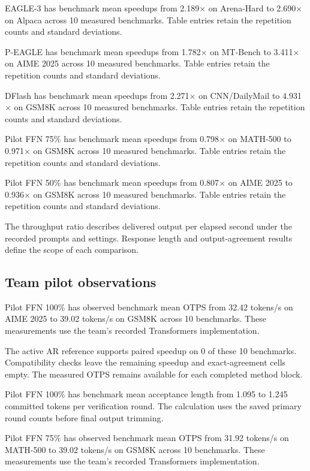 EAGLE-3 has benchmark mean speedups from 2.189\(\times\) on Arena-Hard to 2.690\(\times\) on Alpaca across 10 measured benchmarks. Table entries retain the repetition counts and standard deviations.

P-EAGLE has benchmark mean speedups from 1.782\(\times\) on MT-Bench to 3.411\(\times\) on AIME 2025 across 10 measured benchmarks. Table entries retain the repetition counts and standard deviations.

DFlash has benchmark mean speedups from 2.271\(\times\) on CNN/DailyMail to 4.931\(\times\) on GSM8K across 10 measured benchmarks. Table entries retain the repetition counts and standard deviations.

Pilot FFN 75\% has benchmark mean speedups from 0.798\(\times\) on MATH-500 to 0.971\(\times\) on GSM8K across 10 measured benchmarks. Table entries retain the repetition counts and standard deviations.

Pilot FFN 50\% has benchmark mean speedups from 0.807\(\times\) on AIME 2025 to 0.936\(\times\) on GSM8K across 10 measured benchmarks. Table entries retain the repetition counts and standard deviations.

The throughput ratio describes delivered output per elapsed second under the recorded prompts and settings. Response length and output-agreement results define the scope of each comparison.

\subsection{Team pilot observations}

Pilot FFN 100\% has observed benchmark mean OTPS from 32.42 tokens/s on AIME 2025 to 39.02 tokens/s on GSM8K across 10 benchmarks. These measurements use the team's recorded Transformers implementation.

The active AR reference supports paired speedup on 0 of these 10 benchmarks. Compatibility checks leave the remaining speedup and exact-agreement cells empty. The measured OTPS remains available for each completed method block.

Pilot FFN 100\% has benchmark mean acceptance length from 1.095 to 1.245 committed tokens per verification round. The calculation uses the saved primary round counts before final output trimming.

Pilot FFN 75\% has observed benchmark mean OTPS from 31.92 tokens/s on MATH-500 to 39.02 tokens/s on GSM8K across 10 benchmarks. These measurements use the team's recorded Transformers implementation.

